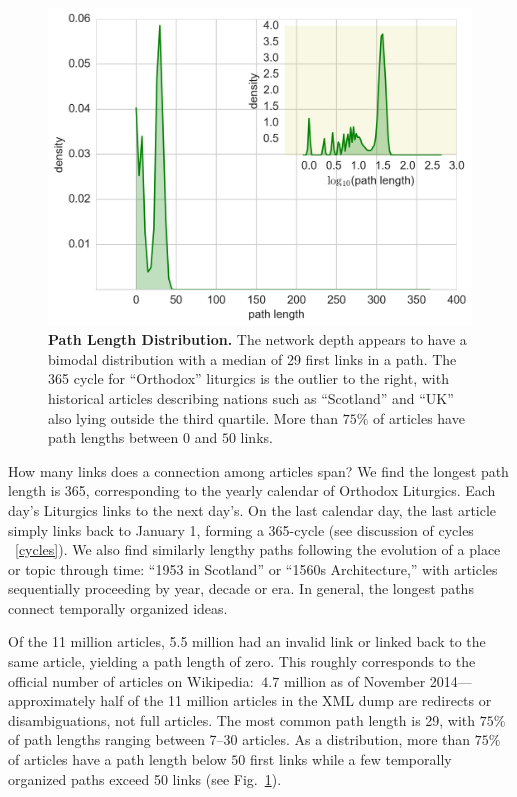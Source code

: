 \documentclass[pre,twocolumn,twoside,superscriptaddress,floatfix]{revtex4-1}
\begin{document}
{\begin{figure}[tp!]
  \includegraphics[width=\columnwidth]{fig007_path_lengths_dist.pdf}
  \caption{
    \textbf{Path Length Distribution.}
The network depth appears to have a bimodal distribution with a median of 29 first links in a path.
The 365 cycle for ``Orthodox'' liturgics is the outlier to the right, with historical articles 
describing nations such as ``Scotland'' and ``UK'' also lying outside the third quartile.
More than $75\%$ of articles have path lengths between 
$0$ and $50$ links.}
  \label{fig:Path Length Distribution}
\end{figure}
How many links does a connection among articles span? 
We find the longest path length is 365,
corresponding to the yearly calendar of Orthodox Liturgics.
Each day's Liturgics links to the next day's. On the last calendar day, the last article simply links back to January 1, forming a 365-cycle 
(see discussion of cycles ~\ref{cycles}).
We also find similarly lengthy paths following the evolution of a place or topic through time: 
``1953 in Scotland'' or ``1560s Architecture,'' with articles sequentially proceeding by year, decade or era.
In general, the longest paths connect temporally organized ideas.

Of the 11 million articles, 5.5 million had an invalid link or linked back to the same article, yielding a path length of zero. 
This roughly corresponds to the official number of articles on Wikipedia: 
$~4.7$ million as of November 2014---approximately half of the 11 million 
articles in the XML dump are redirects or disambiguations, not full articles.
The most common path length is 29, with $75\%$ of path lengths ranging between 7--30 articles.
As a distribution, more than $75\%$ of articles have a path length below 
$50$ first links 
while a few temporally organized paths exceed 50 links 
(see Fig.~\ref{fig:Path Length Distribution}). 

}
\end{document}
